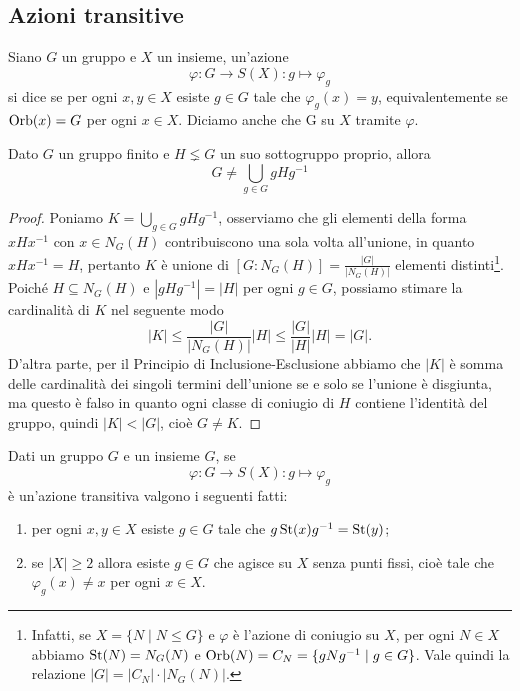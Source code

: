 \documentclass[11pt]{scrartcl}
\begin{document}
\subsection{Azioni transitive}

\begin{definition}
    Siano $G$ un gruppo e $X$ un insieme, un'azione \[
        \varphi:G\longrightarrow S(X) :g \longmapsto \varphi_g
    \]si dice  se per ogni $x, y \in X$ esiste $g \in G$
    tale che $\varphi_g(x) = y$, equivalentemente se $\operatorname{Orb}(x) = G$ per ogni 
    $x \in X$. Diciamo anche che G  su $X$ 
    tramite $\varphi$.
\end{definition}

\begin{lemma}
    \label{lemma2.0}
    Dato $G$ un gruppo finito e $H \lneq G$ un suo sottogruppo proprio, allora \[
        G \neq \bigcup_{g \in G}gHg^{-1}
    \]
\end{lemma}

\begin{proof}
    Poniamo $K = \displaystyle\bigcup_{g \in G}gHg^{-1}$, osserviamo che gli
    elementi della forma $xHx^{-1}$ con $x \in N_G(H)$ contribuiscono una
    sola volta all'unione, in quanto $xHx^{-1} = H$, pertanto $K$
    è unione di $[G:N_G(H)] = \displaystyle\frac{|G|}{|N_G(H)|}$ elementi distinti\footnote
    {Infatti, se $X = \{N\mid N\leqslant G\}$ e $\varphi$ è l'azione di coniugio
    su $X$, per ogni $N \in X$ abbiamo $\operatorname{St}(N) = N_G(N)$ e $\operatorname{Orb}(N) = C_N =
    \{gNg^{-1}\mid g \in G\}$. Vale quindi la relazione $|G| = |C_N|\cdot|N_G(N)|$.}. Poiché
    $H \subseteq N_G(H)$ e $|gHg^{-1}| = |H|$ per ogni $g \in G$, possiamo stimare 
    la cardinalità di $K$ nel seguente modo 
    \[
        |K| \leqslant\frac{|G|}{|N_G(H)|}|H| \leqslant\frac{|G|}{|H|}|H| = |G|.
    \]D'altra parte, per il Principio di Inclusione-Esclusione abbiamo che $|K|$ 
    è somma delle cardinalità dei singoli termini dell'unione se e solo se 
    l'unione è disgiunta, ma questo è falso in quanto ogni classe di coniugio
    di $H$ contiene l'identità del gruppo, quindi $|K| < |G|$, cioè $G \neq K$.
\end{proof}

\begin{proposition}
    \label{prop1.0}
    Dati un gruppo $G$ e un insieme $G$, se 
    \[
        \varphi:G\longrightarrow S(X) :g\longmapsto \varphi_g
    \]è un'azione transitiva valgono i seguenti fatti:
    \begin{enumerate}[(1)]
        \item per ogni $x, y \in X$ esiste $g \in G$ tale che $g\operatorname{St}(x)g^{-1} = \operatorname{St}(y)$;
        \item se $|X|\geqslant 2$ allora esiste $g \in G$ che agisce su $X$ senza
        punti fissi, cioè tale che $\varphi_g(x) \neq x$ per ogni $x \in X$.
    \end{enumerate}
\end{proposition}
\end{document}
